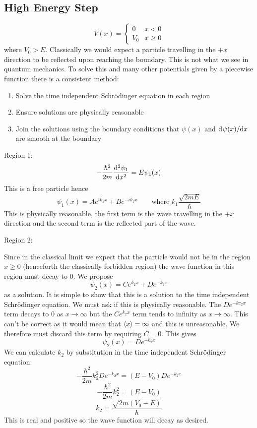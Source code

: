 \documentclass{article}
\begin{document}
    \subsection{High Energy Step}
    \[
        V(x) =
        \begin{cases}
            0 & x < 0\\
            V_0 & x\ge 0
        \end{cases}
    \]
    where \(V_0 > E\). Classically we would expect a particle travelling in the \(+x\) direction to be reflected upon reaching the boundary.
    This is not what we see in quantum mechanics.
    To solve this and many other potentials given by a piecewise function there is a consistent method:
    \begin{enumerate}
        \item Solve the time independent Schr\"odinger equation in each region
        \item Ensure solutions are physically reasonable
        \item Join the solutions using the boundary conditions that \(\psi(x)\) and \(\mathrm{d}^{}{\psi(x)}/\mathrm{d}{x}^{}\) are smooth at the boundary
    \end{enumerate}
    Region 1:
    \[-\frac{\hbar^2}{2m}\dv[2]{\psi_1}{x} = E\psi_1(x)\]
    This is a free particle hence
    \[\psi_1(x) = Ae^{ik_1x} + Be^{-ik_1x}\qquad\text{where }k_1\frac{\sqrt{2mE}}{\hbar}\]
    This is physically reasonable, the first term is the wave travelling in the \(+x\) direction and the second term is the reflected part of the wave.
    
    Region 2:
    
    Since in the classical limit we expect that the particle would not be in the region \(x \ge 0\) (henceforth the classically forbidden region) the wave function in this region must decay to 0.
    We propose
    \[\psi_2(x) = Ce^{k_2x} + De^{-k_2x}\]
    as a solution.
    It is simple to show that this is a solution to the time independent Schr\"odinger equation.
    We must ask if this is physically reasonable.
    The \(De^{-ke_2x}\) term decays to 0 as \(x\to \infty\) but the \(Ce^{k_2x}\) term tends to infinity as \(x\to \infty\).
    This can't be correct as it would mean that \(\left\langle{x}\right\rangle = \infty\) and this is unreasonable.
    We therefore must discard this term by requiring \(C = 0\).
    This gives
    \[\psi_2(x) = De^{-k_2x}\]
    We can calculate \(k_2\) by substitution in the time independent Schr\"odinger equation:
    \[-\frac{\hbar^2}{2m}k_2^2De^{-k_2x} = (E - V_0)De^{-k_2x}\]
    \[-\frac{\hbar^2}{2m}k_2^2 = (E - V_0)\]
    \[k_2 = \frac{\sqrt{2m(V_0 - E)}}{\hbar}\]
    This is real and positive so the wave function will decay as desired.
    
\end{document}
